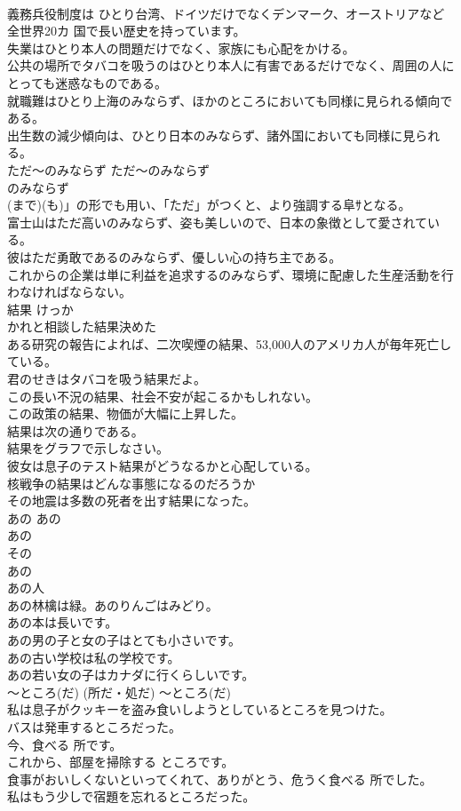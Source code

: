 \documentclass[8pt]{extreport}
\begin{document}
\begin{CJK}{UTF8}{min}
\\	義務兵役制度は ひとり台湾、ドイツだけでなくデンマーク、オーストリアなど全世界20カ 国で長い歴史を持っています。  
\\	失業はひとり本人の問題だけでなく、家族にも心配をかける。  
\\	公共の場所でタバコを吸うのはひとり本人に有害であるだけでなく、周囲の人にとっても迷惑なものである。  
\\	就職難はひとり上海のみならず、ほかのところにおいても同様に見られる傾向である。  
\\	出生数の減少傾向は、ひとり日本のみならず、諸外国においても同様に見られる。  
\\	ただ〜のみならず	ただ〜のみならず	
\\	のみならず
\\	(まで)(も)」の形でも用い、「ただ」がつくと、より強調する阜ｻとなる。	
\\	富士山はただ高いのみならず、姿も美しいので、日本の象徴として愛されている。  
\\	彼はただ勇敢であるのみならず、優しい心の持ち主である。  
\\	これからの企業は単に利益を追求するのみならず、環境に配慮した生産活動を行わなければならない。  
\\	結果	けっか	
\\	かれと相談した結果決めた  
\\	ある研究の報告によれば、二次喫煙の結果、53,000人のアメリカ人が毎年死亡している。  
\\	君のせきはタバコを吸う結果だよ。  
\\	この長い不況の結果、社会不安が起こるかもしれない。  
\\	この政策の結果、物価が大幅に上昇した。  
\\	結果は次の通りである。  
\\	結果をグラフで示しなさい。   
\\	彼女は息子のテスト結果がどうなるかと心配している。   
\\	核戦争の結果はどんな事態になるのだろうか  
\\	その地震は多数の死者を出す結果になった。  
\\	あの	あの	
\\	あの 
\\	その 
\\	あの 
\\	あの人	
\\	あの林檎は緑。あのりんごはみどり。   
\\	あの本は長いです。  
\\	あの男の子と女の子はとても小さいです。  
\\	あの古い学校は私の学校です。  
\\	あの若い女の子はカナダに行くらしいです。   
\\	〜ところ(だ) (所だ・処だ)	〜ところ(だ)	
\\	私は息子がクッキーを盗み食いしようとしているところを見つけた。  
\\	バスは発車するところだった。   
\\	今、食べる 所です。  
\\	これから、部屋を掃除する ところです。  
\\	食事がおいしくないといってくれて、ありがとう、危うく食べる 所でした。  
\\	私はもう少しで宿題を忘れるところだった。  
\end{CJK}
\end{document}
